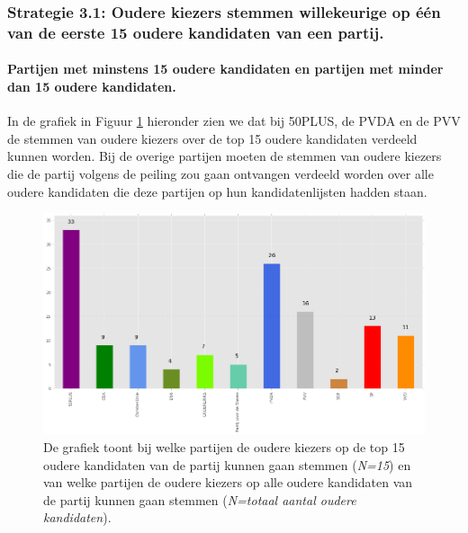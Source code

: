 \subsubsection{Strategie 3.1: Oudere kiezers stemmen willekeurige op één van de eerste 15 oudere kandidaten van een partij.}

\paragraph{Partijen met minstens 15 oudere kandidaten en partijen met minder dan 15 oudere kandidaten.}
In de grafiek in Figuur \ref{fig:15O} hieronder zien we dat bij 50PLUS, de PVDA en de PVV de stemmen van oudere kiezers over de top 15 oudere kandidaten verdeeld kunnen worden. Bij de overige partijen moeten de stemmen van oudere kiezers die de partij volgens de peiling zou gaan ontvangen verdeeld worden over alle oudere kandidaten die deze partijen op hun kandidatenlijsten hadden staan.




\begin{figure}[H]

	\includegraphics[width=\linewidth]	{top15_of_topN_kandidaten_ouderen.png}

			\caption{De grafiek toont bij welke partijen de oudere kiezers op de top 15 oudere kandidaten van de partij kunnen gaan stemmen (\textit{N=15}) en van welke partijen de oudere kiezers op alle oudere kandidaten van de partij kunnen gaan stemmen (\textit{N=totaal aantal oudere kandidaten}).} 


\label{fig:15O}
\end{figure}



